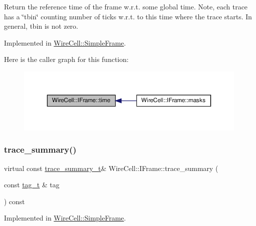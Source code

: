 Return the reference time of the frame w.\+r.\+t. some global time. Note, each trace has a \char`\"{}tbin\char`\"{} counting number of ticks w.\+r.\+t. to this time where the trace starts. In general, tbin is not zero. 

Implemented in \hyperlink{class_wire_cell_1_1_simple_frame_a992d807e8f20c9481deb419496b9de91}{Wire\+Cell\+::\+Simple\+Frame}.

Here is the caller graph for this function\+:
\nopagebreak
\begin{figure}[H]
\begin{center}
\leavevmode
\includegraphics[width=350pt]{class_wire_cell_1_1_i_frame_ae65ceeb2ebe5ef5371793a21a835b0df_icgraph}
\end{center}
\end{figure}
\mbox{\label{class_wire_cell_1_1_i_frame_a4b2841b0245453235f223be1c67c2ff5}} 
\subsubsection{\texorpdfstring{trace\+\_\+summary()}{trace\_summary()}}
{\footnotesize\ttfamily virtual const \hyperlink{class_wire_cell_1_1_i_frame_ad65f8b090c2607591e44d7b40777517e}{trace\+\_\+summary\+\_\+t}\& Wire\+Cell\+::\+I\+Frame\+::trace\+\_\+summary (\begin{DoxyParamCaption}\item[{const \hyperlink{class_wire_cell_1_1_i_frame_ae206ba618e10f398625dfeb675a4215a}{tag\+\_\+t} \&}]{tag }\end{DoxyParamCaption}) const\hspace{0.3cm}{\ttfamily [pure virtual]}}



Implemented in \hyperlink{class_wire_cell_1_1_simple_frame_a3e564b456f19fa5f3afe7639c74ffb00}{Wire\+Cell\+::\+Simple\+Frame}.

\mbox{\label{class_wire_cell_1_1_i_frame_aac1f359b2e383089e718853d359f8a97}} 
